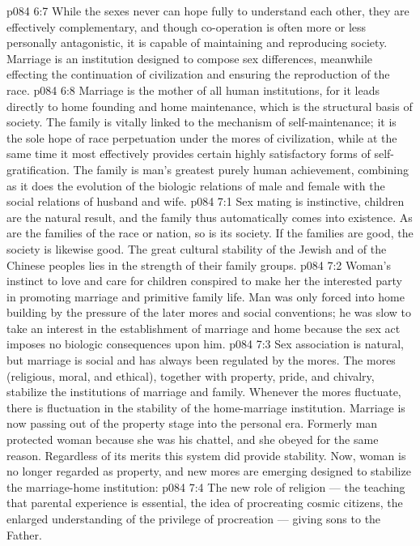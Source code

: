 \vs p084 6:7 \pc While the sexes never can hope fully to understand each other, they are effectively complementary, and though co\hyp{}operation is often more or less personally antagonistic, it is capable of maintaining and reproducing society. Marriage is an institution designed to compose sex differences, meanwhile effecting the continuation of civilization and ensuring the reproduction of the race.
\vs p084 6:8 Marriage is the mother of all human institutions, for it leads directly to home founding and home maintenance, which is the structural basis of society. The family is vitally linked to the mechanism of self\hyp{}maintenance; it is the sole hope of race perpetuation under the mores of civilization, while at the same time it most effectively provides certain highly satisfactory forms of self\hyp{}gratification. The family is man’s greatest purely human achievement, combining as it does the evolution of the biologic relations of male and female with the social relations of husband and wife.
\vs p084 7:1 Sex mating is instinctive, children are the natural result, and the family thus automatically comes into existence. As are the families of the race or nation, so is its society. If the families are good, the society is likewise good. The great cultural stability of the Jewish and of the Chinese peoples lies in the strength of their family groups.
\vs p084 7:2 Woman’s instinct to love and care for children conspired to make her the interested party in promoting marriage and primitive family life. Man was only forced into home building by the pressure of the later mores and social conventions; he was slow to take an interest in the establishment of marriage and home because the sex act imposes no biologic consequences upon him.
\vs p084 7:3 Sex association is natural, but marriage is social and has always been regulated by the mores. The mores (religious, moral, and ethical), together with property, pride, and chivalry, stabilize the institutions of marriage and family. Whenever the mores fluctuate, there is fluctuation in the stability of the home\hyp{}marriage institution. Marriage is now passing out of the property stage into the personal era. Formerly man protected woman because she was his chattel, and she obeyed for the same reason. Regardless of its merits this system did provide stability. Now, woman is no longer regarded as property, and new mores are emerging designed to stabilize the marriage\hyp{}home institution:
\vs p084 7:4 \bibnobreakspace The new role of religion --- the teaching that parental experience is essential, the idea of procreating cosmic citizens, the enlarged understanding of the privilege of procreation --- giving sons to the Father.
